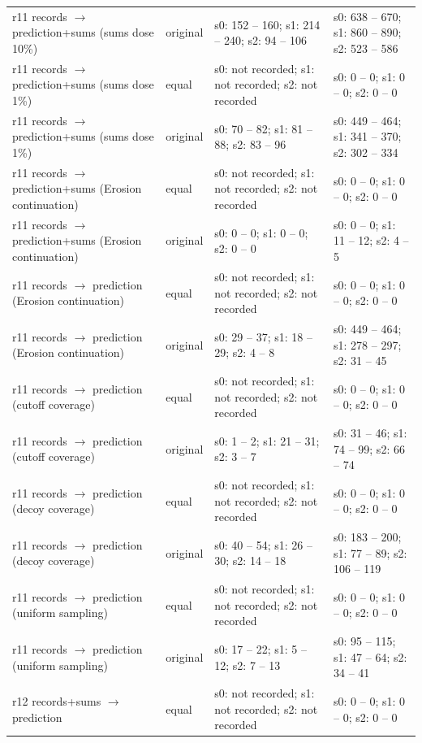 \begin{longtable}{@{}>{\raggedright\arraybackslash}p{1.700in}>{\raggedright\arraybackslash}p{0.400in}>{\raggedright\arraybackslash}p{2.000in}>{\raggedright\arraybackslash}p{2.000in}@{}}
r11 records $\to$ prediction+sums (sums dose 10\%) & original & s0: 152 -- 160; s1: 214 -- 240; s2: 94 -- 106 & s0: 638 -- 670; s1: 860 -- 890; s2: 523 -- 586 \\
r11 records $\to$ prediction+sums (sums dose 1\%) & equal & s0: not recorded; s1: not recorded; s2: not recorded & s0: 0 -- 0; s1: 0 -- 0; s2: 0 -- 0 \\
r11 records $\to$ prediction+sums (sums dose 1\%) & original & s0: 70 -- 82; s1: 81 -- 88; s2: 83 -- 96 & s0: 449 -- 464; s1: 341 -- 370; s2: 302 -- 334 \\
r11 records $\to$ prediction+sums (Erosion continuation) & equal & s0: not recorded; s1: not recorded; s2: not recorded & s0: 0 -- 0; s1: 0 -- 0; s2: 0 -- 0 \\
r11 records $\to$ prediction+sums (Erosion continuation) & original & s0: 0 -- 0; s1: 0 -- 0; s2: 0 -- 0 & s0: 0 -- 0; s1: 11 -- 12; s2: 4 -- 5 \\
r11 records $\to$ prediction (Erosion continuation) & equal & s0: not recorded; s1: not recorded; s2: not recorded & s0: 0 -- 0; s1: 0 -- 0; s2: 0 -- 0 \\
r11 records $\to$ prediction (Erosion continuation) & original & s0: 29 -- 37; s1: 18 -- 29; s2: 4 -- 8 & s0: 449 -- 464; s1: 278 -- 297; s2: 31 -- 45 \\
r11 records $\to$ prediction (cutoff coverage) & equal & s0: not recorded; s1: not recorded; s2: not recorded & s0: 0 -- 0; s1: 0 -- 0; s2: 0 -- 0 \\
r11 records $\to$ prediction (cutoff coverage) & original & s0: 1 -- 2; s1: 21 -- 31; s2: 3 -- 7 & s0: 31 -- 46; s1: 74 -- 99; s2: 66 -- 74 \\
r11 records $\to$ prediction (decoy coverage) & equal & s0: not recorded; s1: not recorded; s2: not recorded & s0: 0 -- 0; s1: 0 -- 0; s2: 0 -- 0 \\
r11 records $\to$ prediction (decoy coverage) & original & s0: 40 -- 54; s1: 26 -- 30; s2: 14 -- 18 & s0: 183 -- 200; s1: 77 -- 89; s2: 106 -- 119 \\
r11 records $\to$ prediction (uniform sampling) & equal & s0: not recorded; s1: not recorded; s2: not recorded & s0: 0 -- 0; s1: 0 -- 0; s2: 0 -- 0 \\
r11 records $\to$ prediction (uniform sampling) & original & s0: 17 -- 22; s1: 5 -- 12; s2: 7 -- 13 & s0: 95 -- 115; s1: 47 -- 64; s2: 34 -- 41 \\
r12 records+sums $\to$ prediction & equal & s0: not recorded; s1: not recorded; s2: not recorded & s0: 0 -- 0; s1: 0 -- 0; s2: 0 -- 0 \\

\end{longtable}
